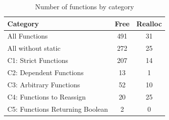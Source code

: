 \begin{table}[H]
   \centering
   \begin{tabularx}{0.7\linewidth}{l|c|c}

      Category & Free & Realloc \\
      \hline

      All Functions& 491 & 31 \\

      All without static& 272 & 25 \\

\hline
      C1: Strict Functions& 207 & 14 \\

      C2: Dependent Functions& 13 & 1 \\

      C3: Arbitrary Functions& 52 & 10 \\

      C4: Functions to Reassign& 20 & 25 \\

      C5: Functions Returning Boolean& 2 & 0 \\

   \end{tabularx}
   \caption{Number of functions by category}
   \label{tab:categories:overview}
\end{table}

